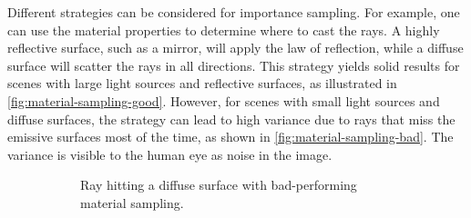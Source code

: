 Different strategies can be considered for importance sampling. For example, one can use the material properties to determine where to cast the rays. A highly reflective surface, such as a mirror, will apply the law of reflection, while a diffuse surface will scatter the rays in all directions. This strategy yields solid results for scenes with large light sources and reflective surfaces, as illustrated in \autoref{fig:material-sampling-good}. However, for scenes with small light sources and diffuse surfaces, the strategy can lead to high variance due to rays that miss the emissive surfaces most of the time, as shown in \autoref{fig:material-sampling-bad}. The variance is visible to the human eye as noise in the image.

\begin{figure}[H]
  \centering
  \begin{subfigure}[t]{0.45\textwidth}
    \centering
    \caption{Ray hitting a diffuse surface with bad-performing material sampling.}
    \label{fig:material-sampling-bad}
  \end{subfigure}
  \hfill
  \begin{subfigure}[t]{0.45\textwidth}
    \centering
\end{subfigure}
\end{figure}
